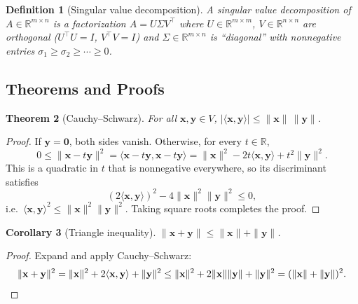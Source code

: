 \documentclass[11pt]{article}
\newtheorem{theorem}{Theorem}[section]
\newtheorem{definition}[theorem]{Definition}
\newtheorem{corollary}[theorem]{Corollary}
\theoremstyle{remark}
\begin{document}
\begin{definition}[Singular value decomposition]
A \emph{singular value decomposition} of $A\in\mathbb{R}^{m\times n}$ is a factorization $A=U\Sigma V^\top$ where $U\in\mathbb{R}^{m\times m}$, $V\in\mathbb{R}^{n\times n}$ are orthogonal ($U^\top U=I$, $V^\top V=I$) and $\Sigma\in\mathbb{R}^{m\times n}$ is ``diagonal'' with nonnegative entries $\sigma_1\ge\sigma_2\ge\cdots\ge 0$.
\end{definition}

\subsection*{Theorems and Proofs}

\begin{theorem}[Cauchy--Schwarz]
For all $\mathbf{x},\mathbf{y}\in V$, $|\langle\mathbf{x},\mathbf{y}\rangle|\le\|\mathbf{x}\|\,\|\mathbf{y}\|$.
\end{theorem}
\begin{proof}
If $\mathbf{y}=\mathbf{0}$, both sides vanish. Otherwise, for every $t\in\mathbb{R}$,
\[
0\le\|\mathbf{x}-t\mathbf{y}\|^2=\langle\mathbf{x}-t\mathbf{y},\mathbf{x}-t\mathbf{y}\rangle=\|\mathbf{x}\|^2-2t\langle\mathbf{x},\mathbf{y}\rangle+t^2\|\mathbf{y}\|^2.
\]
This is a quadratic in $t$ that is nonnegative everywhere, so its discriminant satisfies
\[
(2\langle\mathbf{x},\mathbf{y}\rangle)^2-4\|\mathbf{x}\|^2\|\mathbf{y}\|^2\le 0,
\]
i.e.\ $\langle\mathbf{x},\mathbf{y}\rangle^2\le\|\mathbf{x}\|^2\|\mathbf{y}\|^2$. Taking square roots completes the proof.
\end{proof}

\begin{corollary}[Triangle inequality]
$\|\mathbf{x}+\mathbf{y}\|\le\|\mathbf{x}\|+\|\mathbf{y}\|$.
\end{corollary}
\begin{proof}
Expand and apply Cauchy--Schwarz:
\[
\|\mathbf{x}+\mathbf{y}\|^2=\|\mathbf{x}\|^2+2\langle\mathbf{x},\mathbf{y}\rangle+\|\mathbf{y}\|^2\le\|\mathbf{x}\|^2+2\|\mathbf{x}\|\|\mathbf{y}\|+\|\mathbf{y}\|^2=(\|\mathbf{x}\|+\|\mathbf{y}\|)^2.\qedhere
\]
\end{proof}
\end{document}
